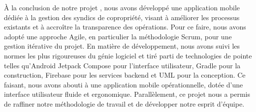 À la conclusion de notre projet , nous avons développé une application mobile dédiée à la gestion des syndics de copropriété, visant à améliorer les processus existants et à accroître la transparence des opérations. 
Pour ce faire, nous avons adopté une approche Agile, en particulier la méthodologie Scrum, pour une gestion itérative du projet.
 En matière de développement, nous avons suivi les normes les plus rigoureuses du génie logiciel et tiré parti de technologies de pointe telles qu'Android Jetpack Compose pour l'interface utilisateur, Gradle pour la construction, Firebase pour les services backend et UML pour la conception.
Ce faisant, nous avons abouti à une application mobile opérationnelle, dotée d'une interface utilisateur fluide et ergonomique.
Parallèlement, ce projet nous a permis de raffiner notre méthodologie de travail et de développer notre esprit d’équipe.